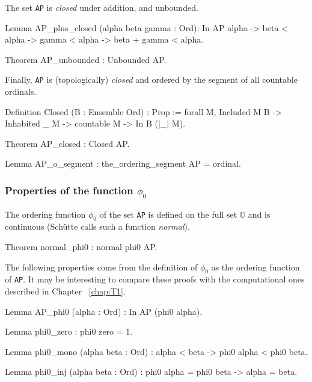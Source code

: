 {The set  \texttt{AP} is  \emph{closed} under addition, and unbounded.

\begin{Coqsrc}
Lemma AP_plus_closed (alpha beta gamma : Ord): 
     In AP alpha -> beta < alpha -> gamma < alpha ->
     beta + gamma < alpha.

Theorem AP_unbounded : Unbounded AP.
\end{Coqsrc}

Finally, \texttt{AP} is (topologically) \emph{closed} and ordered by the segment of all countable ordinals.


\begin{Coqsrc} 
Definition Closed (B : Ensemble Ord) : Prop := 
  forall M, Included M B -> Inhabited _ M -> 
                 countable M -> In B (|_| M).
\end{Coqsrc}

\begin{Coqsrc}
Theorem AP_closed : Closed AP.

Lemma AP_o_segment :  the_ordering_segment AP = ordinal.
\end{Coqsrc}

\subsubsection{Properties of the function \texorpdfstring{$\phi_0$}{phi0}}
 
The ordering function $\phi_0$ of the set \texttt{AP} is defined on the full set $\mathbb{O}$ and is continuous (Schütte calls such a  function  \emph{normal}).

\begin{Coqsrc}
Theorem normal_phi0 : normal phi0 AP.
\end{Coqsrc}

The following properties come from  the definition of $\phi_0$ as the ordering function of \texttt{AP}. It may be interesting to compare these proofs with the computational ones described in Chapter ~\ref{chap:T1}.

\begin{Coqsrc}
Lemma AP_phi0 (alpha : Ord) : In AP (phi0 alpha).

Lemma phi0_zero : phi0 zero =  1.

Lemma phi0_mono (alpha beta : Ord) :
  alpha < beta ->  phi0 alpha < phi0 beta.

Lemma phi0_inj (alpha beta : Ord) :
    phi0 alpha = phi0 beta -> alpha = beta.


\end{Coqsrc}}
